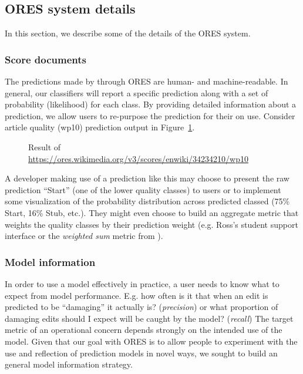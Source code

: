 \subsection{ORES system details}
In this section, we describe some of the details of the ORES system.

\subsubsection{Score documents}
\label{sec:appendix.score_documents}
The predictions made by through ORES are human- and machine-readable.  In general, our classifiers will report a specific prediction along with a set of probability (likelihood) for each class.  By providing detailed information about a prediction, we allow users to re-purpose the prediction for their on use.  Consider article quality (wp10) prediction output in Figure~\ref{fig:english_damaging_model_info}.

\begin{figure}[htbp]
        \caption{Result of \url{https://ores.wikimedia.org/v3/scores/enwiki/34234210/wp10}}
        \label{fig:english_damaging_model_info}
\end{figure}

A developer making use of a prediction like this may choose to present the raw prediction ``Start'' (one of the lower quality classes) to users or to implement some visualization of the probability distribution across predicted classed (75\% Start, 16\% Stub, etc.).  They might even choose to build an aggregate metric that weights the quality classes by their prediction weight (e.g. Ross's student support interface\cite{ross2016visualizing} or the \emph{weighted sum} metric from \cite{halfaker2017interpolating}).

\subsubsection{Model information}
\label{sec:appendix.model_information}
In order to use a model effectively in practice, a user needs to know what to expect from model performance.  E.g. how often is it that when an edit is predicted to be ``damaging'' it actually is? (\emph{precision}) or what proportion of damaging edits should I expect will be caught by the model? (\emph{recall})  The target metric of an operational concern depends strongly on the intended use of the model.  Given that our goal with ORES is to allow people to experiment with the use and reflection of prediction models in novel ways, we sought to build an general model information strategy.

